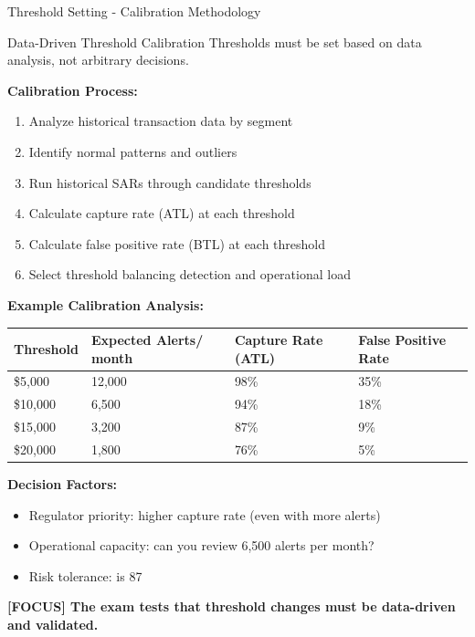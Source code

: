 \documentclass[11pt,a4paper]{beamer}
\newcommand{\examfocus}[1]{\textcolor{orange!80!black}{\textbf{[FOCUS] #1}}}
\begin{document}
	\begin{frame}{Threshold Setting - Calibration Methodology}
		\begin{block}{Data-Driven Threshold Calibration}
			Thresholds must be set based on data analysis, not arbitrary decisions.
		\end{block}
		
		\textbf{Calibration Process:}
		\begin{enumerate}
			\item Analyze historical transaction data by segment
			\item Identify normal patterns and outliers
			\item Run historical SARs through candidate thresholds
			\item Calculate capture rate (ATL) at each threshold
			\item Calculate false positive rate (BTL) at each threshold
			\item Select threshold balancing detection and operational load
		\end{enumerate}
		
		\textbf{Example Calibration Analysis:}
		\begin{longtable}{p{}|p{}|p{}|p{}}
			\hline
			\rowcolor{lightgray}
			\textbf{Threshold} & \textbf{Expected Alerts/ month} & \textbf{Capture Rate (ATL)} & \textbf{False Positive Rate} \\
			\hline
			\$5,000 & 12,000 & 98\% & 35\% \\
			\hline
			\$10,000 & 6,500 & 94\% & 18\% \\
			\hline
			\$15,000 & 3,200 & 87\% & 9\% \\
			\hline
			\$20,000 & 1,800 & 76\% & 5\% \\
			\hline
		\end{longtable}
		
		\textbf{Decision Factors:}
		\begin{itemize}
			\item Regulator priority: higher capture rate (even with more alerts)
			\item Operational capacity: can you review 6,500 alerts per month?
			\item Risk tolerance: is 87%
		\end{itemize}
		
		\examfocus{The exam tests that threshold changes must be data-driven and validated.}
	\end{frame}
	
\end{document}
